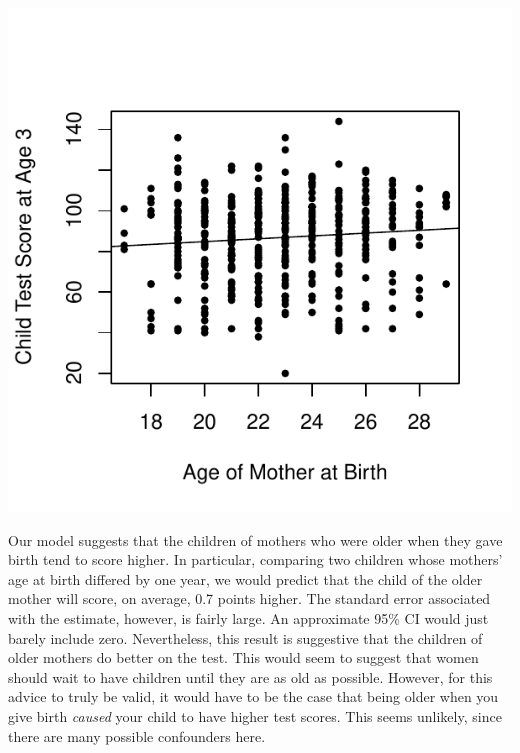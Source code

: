 \documentclass[addpoints,12pt]{exam}\usepackage[]{graphicx}\usepackage[]{color}
\makeatletter
\def\maxwidth{ %
  \ifdim\Gin@nat@width>\linewidth
    \linewidth
  \else
    \Gin@nat@width
  \fi
}
\newenvironment{knitrout}{}{} %
\makeatother
\begin{document}
\begin{questions}
\begin{parts}
\begin{solution}
\begin{knitrout}
{\centering \includegraphics[width=\maxwidth]{figure/unnamed-chunk-5-1} 

}



\end{knitrout}
Our model suggests that the children of mothers who were older when they gave birth tend to score higher. In particular, comparing two children whose mothers' age at birth differed by one year, we would predict that the child of the older mother will score, on average, 0.7 points higher. The standard error associated with the estimate, however, is fairly large. An approximate 95\% CI would just barely include zero. Nevertheless, this result is suggestive that the children of older mothers do better on the test. This would seem to suggest that women should wait to have children until they are as old as possible. However, for this advice to truly be valid, it would have to be the case that being older when you give birth \emph{caused} your child to have higher test scores. This seems unlikely, since there are many possible confounders here.
    \end{solution}

\end{parts}
\end{questions}
\end{document}

